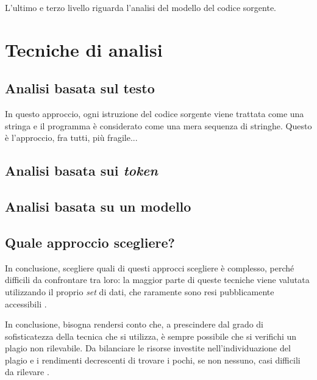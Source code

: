 L'ultimo e terzo livello riguarda l'analisi del modello del codice sorgente.

\section{Tecniche di analisi}

\subsection{Analisi basata sul testo}
In questo approccio, ogni istruzione del codice sorgente viene trattata come una stringa e il programma è considerato come una mera sequenza di stringhe.
%
Questo è l'approccio, fra tutti, più fragile...

\subsection{Analisi basata sui \textit{token}}

\subsection{Analisi basata su un modello}

\subsection{Quale approccio scegliere?}
In conclusione, scegliere quali di questi approcci scegliere è complesso, perché difficili da confrontare tra loro: la maggior parte di queste tecniche viene valutata utilizzando il proprio \textit{set} di dati, che raramente sono resi pubblicamente accessibili \cite{karnalim-budi-toba-joy-2019}.

In conclusione, bisogna rendersi conto che, a prescindere dal grado di sofisticatezza della tecnica che si utilizza, è sempre possibile che si verifichi un plagio non rilevabile.
%
Da bilanciare le risorse investite nell'individuazione del plagio e i rendimenti decrescenti di trovare i pochi, se non nessuno, casi difficili da rilevare \cite{joy-99}.


